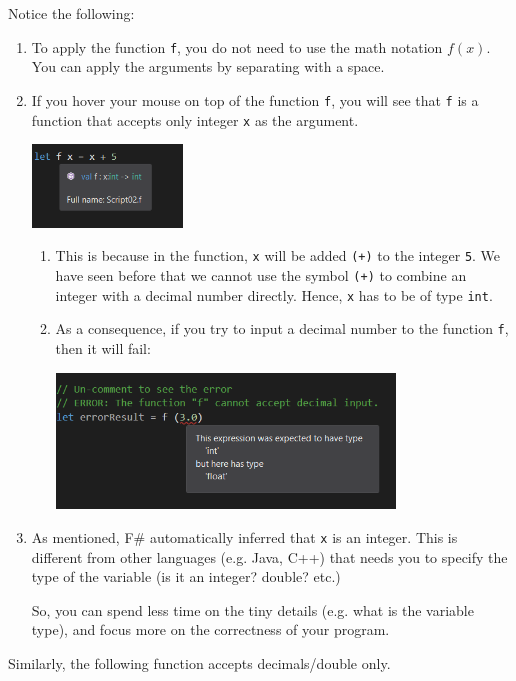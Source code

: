 \documentclass[12pt]{article}
\begin{document}
Notice the following:
\begin{enumerate}
\item To apply the function \texttt{f}, you do not need to use the math notation $f(x)$. You can apply the arguments by separating with a space.
\item If you hover your mouse on top of the function \texttt{f}, you will see that \texttt{f} is a function that accepts only integer \texttt{x} as the argument.
\begin{center}
\includegraphics[width=4cm]{pictures/picture06.png}
\end{center}
\begin{enumerate}
\item This is because in the function, \texttt{x} will be added \texttt{(+)} to the integer \texttt{5}. We have seen before that we cannot use the symbol \texttt{(+)} to combine an integer with a decimal number directly. Hence, \texttt{x} has to be of type \texttt{int}.
\item As a consequence, if you try to input a decimal number to the function \texttt{f}, then it will fail:
\begin{center}
\includegraphics[width=9cm]{pictures/picture07.png}
\end{center}
\end{enumerate}
\item As mentioned, F\# automatically inferred that \texttt{x} is an integer. This is different from other languages (e.g. Java, C++) that needs you to specify the type of the variable (is it an integer? double? etc.)
 
So, you can spend less time on the tiny details (e.g. what is the variable type), and focus more on the correctness of your program.
\end{enumerate}

\pagebreak

Similarly, the following function accepts decimals/double only.
\end{document}
